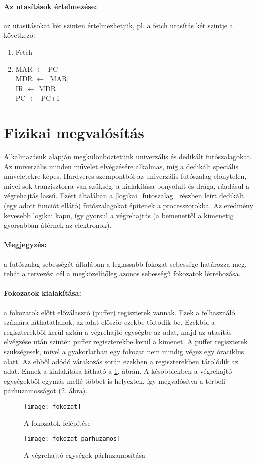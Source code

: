 \paragraph{Az utasítások értelmezése:} az utasításokat két szinten értelmezhetjük, pl. a fetch utasítás két szintje a következő:
\begin{enumerate}
    \item Fetch
    \item MAR $\leftarrow$ PC\\
    MDR $\leftarrow$ [MAR] \\
    IR $\leftarrow$ MDR \\
    PC $\leftarrow$ PC+1
\end{enumerate}

\section{Fizikai megvalósítás}
Alkalmazásuk alapján megkülönböztetünk univerzális és dedikált futószalagokat.
Az univerzális minden művelet elvégzésére alkalmas, míg a dedikált speciális műveletekre képes.
Hardveres szempontból az univerzális futószalag előnytelen, mivel sok tranzisztorra van szükség, a kialakítása bonyolult és drága, ráadásul a végrehajtás lassú.
Ezért általában a \ref{logikai_futoszalag}. részben leírt dedikált (egy adott funciót ellátó) futószalagokat építenek a processzorokba.
Az eredmény kevesebb logikai kapu, így gyorsul a végrehajtás (a bemenettől a kimenetig gyorsabban átérnek az elektronok).
\paragraph{Megjegyzés:} a futószalag sebességét általában a leglassabb fokozat sebessége határozza meg, tehát a tervezési cél a megközelítőleg azonos sebességű fokozatok létrehozása.
\paragraph{Fokozatok kialakítása:} a fokozatok előtt előválasztó (puffer) regiszterek vannak. Ezek a felhasználó számára láthatatlanok, az adat először ezekbe töltődik be.
Ezekből a regiszterekből kerül aztán a végrehajtó egységbe az adat, majd az utasítás elvégzése után szintén puffer regiszterekbe kerül a kimenet.
A puffer regiszterek szükségesek, mivel a gyakorlatban egy fokozat nem mindig végez egy óraciklus alatt.
Az ebből adódó várakozás során ezekben a regiszterekben tárolódik az adat.
Ennek a kialakítása látható a \ref{fig:fokozat}. ábrán. A későbbiekben a végrehajtó egységekből egymás mellé többet is helyeztek, így megvalósítva a térbeli párhuzamosságot (\ref{fig:fokozat_parhuzamos}. ábra).
\begin{figure}[h]
    \texttt{[image: fokozat]}
    \centering
    \caption{A fokozatok felépítése}
    \label{fig:fokozat}
\end{figure}
\begin{figure}[h]
    \texttt{[image: fokozat\_parhuzamos]}
    \centering
    \caption{A végrehajtó egységek párhuzamosítása}
    \label{fig:fokozat_parhuzamos}
\end{figure}

